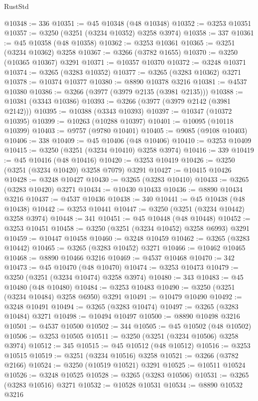 \begin{lexlean}{RustStd}
\begin{coremodule}
@10348 := 336
@10351 := @45 @10348 (@48 @10348)
@10352 := @3253 @10351
@10357 := @3250 (@3251 (@3234 @10352) @3258 @3974)
@10358 := 337
@10361 := @45 @10358 (@48 @10358)
@10362 := @3253 @10361
@10365 := @3251 (@3234 @10362) @3258
@10367 := @3266 (@3782 @1655)
@10370 := @3250 (@10365 @10367) @3291
@10371 := @10357 @10370
@10372 := @3248 @10371
@10374 := @3265 (@3283 @10352)
@10377 := @3265 (@3283 @10362) @3271
@10378 := @10374 @10377
@10380 := @8890 @10378 @3216
@10381 := @4537 @10380
@10386 := @3266 (@3977 (@3979 @2135 (@3981 @2135)))
@10388 := @10381 (@3343 @10386)
@10393 := @3266 (@3977 (@3979 @2142 (@3981 @2142)))
@10395 := @10388 (@3343 @10393)
@10397 := @10347 (@10372 @10395)
@10399 := @10263 (@10288 @10397)
@10401 := @10095 (@10118 @10399)
@10403 := @9757 (@9780 @10401)
@10405 := @9085 (@9108 @10403)
@10406 := 338
@10409 := @45 @10406 (@48 @10406)
@10410 := @3253 @10409
@10415 := @3250 (@3251 (@3234 @10410) @3258 @3974)
@10416 := 339
@10419 := @45 @10416 (@48 @10416)
@10420 := @3253 @10419
@10426 := @3250 (@3251 (@3234 @10420) @3258 @7079) @3291
@10427 := @10415 @10426
@10428 := @3248 @10427
@10430 := @3265 (@3283 @10410)
@10433 := @3265 (@3283 @10420) @3271
@10434 := @10430 @10433
@10436 := @8890 @10434 @3216
@10437 := @4537 @10436
@10438 := 340
@10441 := @45 @10438 (@48 @10438)
@10442 := @3253 @10441
@10447 := @3250 (@3251 (@3234 @10442) @3258 @3974)
@10448 := 341
@10451 := @45 @10448 (@48 @10448)
@10452 := @3253 @10451
@10458 := @3250 (@3251 (@3234 @10452) @3258 @6993) @3291
@10459 := @10447 @10458
@10460 := @3248 @10459
@10462 := @3265 (@3283 @10442)
@10465 := @3265 (@3283 @10452) @3271
@10466 := @10462 @10465
@10468 := @8890 @10466 @3216
@10469 := @4537 @10468
@10470 := 342
@10473 := @45 @10470 (@48 @10470)
@10474 := @3253 @10473
@10479 := @3250 (@3251 (@3234 @10474) @3258 @3974)
@10480 := 343
@10483 := @45 @10480 (@48 @10480)
@10484 := @3253 @10483
@10490 := @3250 (@3251 (@3234 @10484) @3258 @6950) @3291
@10491 := @10479 @10490
@10492 := @3248 @10491
@10494 := @3265 (@3283 @10474)
@10497 := @3265 (@3283 @10484) @3271
@10498 := @10494 @10497
@10500 := @8890 @10498 @3216
@10501 := @4537 @10500
@10502 := 344
@10505 := @45 @10502 (@48 @10502)
@10506 := @3253 @10505
@10511 := @3250 (@3251 (@3234 @10506) @3258 @3974)
@10512 := 345
@10515 := @45 @10512 (@48 @10512)
@10516 := @3253 @10515
@10519 := @3251 (@3234 @10516) @3258
@10521 := @3266 (@3782 @2166)
@10524 := @3250 (@10519 @10521) @3291
@10525 := @10511 @10524
@10526 := @3248 @10525
@10528 := @3265 (@3283 @10506)
@10531 := @3265 (@3283 @10516) @3271
@10532 := @10528 @10531
@10534 := @8890 @10532 @3216

\end{coremodule}
\end{lexlean}
